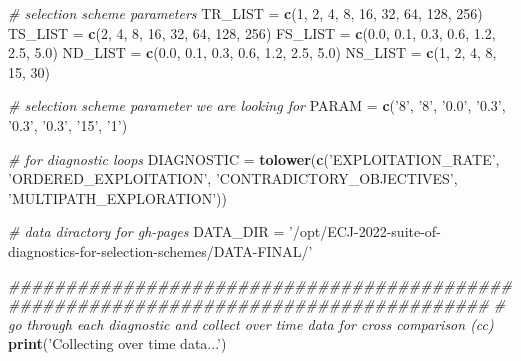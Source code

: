 \documentclass[]{book}
\newenvironment{Shaded}{\begin{snugshade}}{\end{snugshade}}
\newcommand{\CommentTok}[1]{\textcolor[rgb]{0.56,0.35,0.01}{\textit{#1}}}
\newcommand{\DecValTok}[1]{\textcolor[rgb]{0.00,0.00,0.81}{#1}}
\newcommand{\FloatTok}[1]{\textcolor[rgb]{0.00,0.00,0.81}{#1}}
\newcommand{\KeywordTok}[1]{\textcolor[rgb]{0.13,0.29,0.53}{\textbf{#1}}}
\newcommand{\NormalTok}[1]{#1}
\newcommand{\StringTok}[1]{\textcolor[rgb]{0.31,0.60,0.02}{#1}}
\begin{document}
\begin{Shaded}
\begin{Highlighting}[]
\CommentTok{# selection scheme parameters}
\NormalTok{TR_LIST =}\StringTok{ }\KeywordTok{c}\NormalTok{(}\DecValTok{1}\NormalTok{, }\DecValTok{2}\NormalTok{, }\DecValTok{4}\NormalTok{, }\DecValTok{8}\NormalTok{, }\DecValTok{16}\NormalTok{, }\DecValTok{32}\NormalTok{, }\DecValTok{64}\NormalTok{, }\DecValTok{128}\NormalTok{, }\DecValTok{256}\NormalTok{)}
\NormalTok{TS_LIST =}\StringTok{ }\KeywordTok{c}\NormalTok{(}\DecValTok{2}\NormalTok{, }\DecValTok{4}\NormalTok{, }\DecValTok{8}\NormalTok{, }\DecValTok{16}\NormalTok{, }\DecValTok{32}\NormalTok{, }\DecValTok{64}\NormalTok{, }\DecValTok{128}\NormalTok{, }\DecValTok{256}\NormalTok{)}
\NormalTok{FS_LIST =}\StringTok{ }\KeywordTok{c}\NormalTok{(}\FloatTok{0.0}\NormalTok{, }\FloatTok{0.1}\NormalTok{, }\FloatTok{0.3}\NormalTok{, }\FloatTok{0.6}\NormalTok{, }\FloatTok{1.2}\NormalTok{, }\FloatTok{2.5}\NormalTok{, }\FloatTok{5.0}\NormalTok{)}
\NormalTok{ND_LIST =}\StringTok{ }\KeywordTok{c}\NormalTok{(}\FloatTok{0.0}\NormalTok{, }\FloatTok{0.1}\NormalTok{, }\FloatTok{0.3}\NormalTok{, }\FloatTok{0.6}\NormalTok{, }\FloatTok{1.2}\NormalTok{, }\FloatTok{2.5}\NormalTok{, }\FloatTok{5.0}\NormalTok{)}
\NormalTok{NS_LIST =}\StringTok{ }\KeywordTok{c}\NormalTok{(}\DecValTok{1}\NormalTok{, }\DecValTok{2}\NormalTok{, }\DecValTok{4}\NormalTok{, }\DecValTok{8}\NormalTok{, }\DecValTok{15}\NormalTok{, }\DecValTok{30}\NormalTok{)}

\CommentTok{# selection scheme parameter we are looking for}
\NormalTok{PARAM =}\StringTok{ }\KeywordTok{c}\NormalTok{(}\StringTok{'8'}\NormalTok{, }\StringTok{'8'}\NormalTok{, }\StringTok{'0.0'}\NormalTok{, }\StringTok{'0.3'}\NormalTok{, }\StringTok{'0.3'}\NormalTok{, }\StringTok{'0.3'}\NormalTok{, }\StringTok{'15'}\NormalTok{, }\StringTok{'1'}\NormalTok{)}

\CommentTok{# for diagnostic loops}
\NormalTok{DIAGNOSTIC =}\StringTok{ }\KeywordTok{tolower}\NormalTok{(}\KeywordTok{c}\NormalTok{(}\StringTok{'EXPLOITATION_RATE'}\NormalTok{, }\StringTok{'ORDERED_EXPLOITATION'}\NormalTok{, }\StringTok{'CONTRADICTORY_OBJECTIVES'}\NormalTok{, }\StringTok{'MULTIPATH_EXPLORATION'}\NormalTok{))}

\CommentTok{# data diractory for gh-pages}
\NormalTok{DATA_DIR =}\StringTok{ '/opt/ECJ-2022-suite-of-diagnostics-for-selection-schemes/DATA-FINAL/'}

\CommentTok{######################################################################################}
\CommentTok{# go through each diagnostic and collect over time data for cross comparison (cc)}
\KeywordTok{print}\NormalTok{(}\StringTok{'Collecting over time data...'}\NormalTok{)}
\end{Highlighting}
\end{Shaded}
\end{document}
